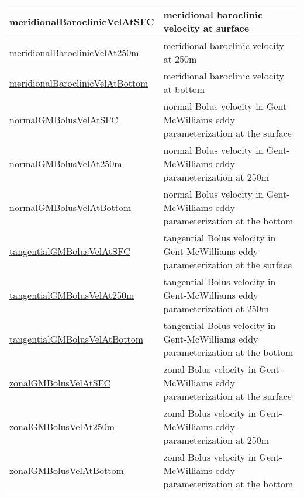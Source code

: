 {\begin{center}
\begin{longtable}{| p{2.0in} | p{4.0in} |}
    \hline
    \hyperref[subsec:var_sec_highFrequencyOutputAM_meridionalBaroclinicVelAtSFC]{meridionalBaroclinicVelAtSFC} & meridional baroclinic velocity at surface \\
    \hline
    \hyperref[subsec:var_sec_highFrequencyOutputAM_meridionalBaroclinicVelAt250m]{meridionalBaroclinicVelAt250m} & meridional baroclinic velocity at 250m \\
    \hline
    \hyperref[subsec:var_sec_highFrequencyOutputAM_meridionalBaroclinicVelAtBottom]{meridionalBaroclinicVelAt\-Bottom} & meridional baroclinic velocity at bottom \\
    \hline
    \hyperref[subsec:var_sec_highFrequencyOutputAM_normalGMBolusVelAtSFC]{normalGMBolusVelAtSFC} & normal Bolus velocity in Gent-McWilliams eddy parameterization at the surface \\
    \hline
    \hyperref[subsec:var_sec_highFrequencyOutputAM_normalGMBolusVelAt250m]{normalGMBolusVelAt250m} & normal Bolus velocity in Gent-McWilliams eddy parameterization at 250m \\
    \hline
    \hyperref[subsec:var_sec_highFrequencyOutputAM_normalGMBolusVelAtBottom]{normalGMBolusVelAtBottom} & normal Bolus velocity in Gent-McWilliams eddy parameterization at the bottom \\
    \hline
    \hyperref[subsec:var_sec_highFrequencyOutputAM_tangentialGMBolusVelAtSFC]{tangentialGMBolusVelAtSFC} & tangential Bolus velocity in Gent-McWilliams eddy parameterization at the surface \\
    \hline
    \hyperref[subsec:var_sec_highFrequencyOutputAM_tangentialGMBolusVelAt250m]{tangentialGMBolusVelAt250m} & tangential Bolus velocity in Gent-McWilliams eddy parameterization at 250m \\
    \hline
    \hyperref[subsec:var_sec_highFrequencyOutputAM_tangentialGMBolusVelAtBottom]{tangentialGMBolusVelAtBottom} & tangential Bolus velocity in Gent-McWilliams eddy parameterization at the bottom \\
    \hline
    \hyperref[subsec:var_sec_highFrequencyOutputAM_zonalGMBolusVelAtSFC]{zonalGMBolusVelAtSFC} & zonal Bolus velocity in Gent-McWilliams eddy parameterization at the surface \\
    \hline
    \hyperref[subsec:var_sec_highFrequencyOutputAM_zonalGMBolusVelAt250m]{zonalGMBolusVelAt250m} & zonal Bolus velocity in Gent-McWilliams eddy parameterization at 250m \\
    \hline
    \hyperref[subsec:var_sec_highFrequencyOutputAM_zonalGMBolusVelAtBottom]{zonalGMBolusVelAtBottom} & zonal Bolus velocity in Gent-McWilliams eddy parameterization at the bottom \\

\end{longtable}
\end{center}}

